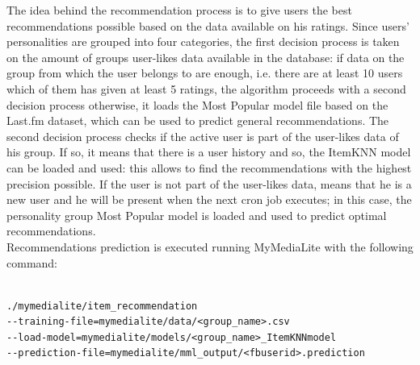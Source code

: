 \documentclass[b5paper,10pt,twoside,cucitura]{toptesi}
\begin{document}
The idea behind the recommendation process is to give users the best recommendations possible based on the data available on his ratings. Since users' personalities are grouped into four categories, the first decision process is taken on the amount of groups user-likes data available in the database: if data on the group from which the user belongs to are enough, i.e. there are at least 10 users which of them has given at least 5 ratings, the algorithm proceeds with a second decision process otherwise, it loads the Most Popular model file based on the Last.fm dataset, which can be used to predict general recommendations. The second decision process checks if the active user is part of the user-likes data of his group. If so, it means that there is a user history and so, the ItemKNN model can be loaded and used: this allows to find the recommendations with the highest precision possible. If the user is not part of the user-likes data, means that he is a new user and he will be present when the next cron job executes; in this case, the personality group Most Popular model is loaded and used to predict optimal recommendations.
\\
Recommendations prediction is executed running MyMediaLite with the following command:

\begin{verbatim}

./mymedialite/item_recommendation 
--training-file=mymedialite/data/<group_name>.csv 
--load-model=mymedialite/models/<group_name>_ItemKNNmodel  
--prediction-file=mymedialite/mml_output/<fbuserid>.prediction

\end{verbatim}
\end{document}
